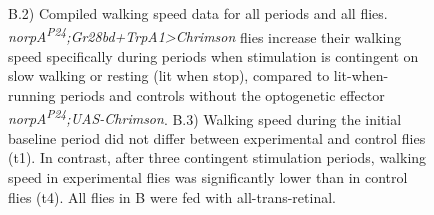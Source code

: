 \documentclass[10pt]{article}
\begin{document}
\begin{figure}[t!]
{	B.2) Compiled walking speed data for all periods and all flies. \textit{norpA\textsuperscript{P24};Gr28bd+TrpA1>Chrimson} flies increase their walking speed specifically during periods when stimulation is contingent on slow walking or resting (lit when stop), compared to lit-when-running periods and controls without the optogenetic effector \textit{norpA\textsuperscript{P24};UAS-Chrimson}. 
	B.3) Walking speed during the initial baseline period did not differ between experimental and control flies (t1). In contrast, after three contingent stimulation periods, walking speed in experimental flies was significantly lower than in control flies (t4). 
	All flies in B were fed with all-trans-retinal.} 
\end{figure}
\end{document}
